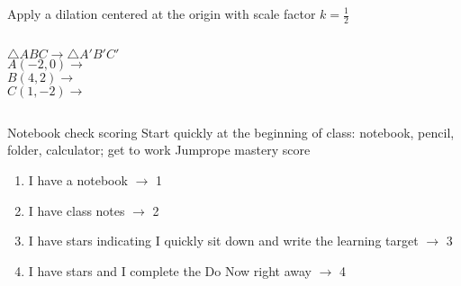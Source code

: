 \begin{frame}{Apply a dilation centered at the origin with scale factor $k=\frac{1}{2}$}
  \begin{columns}
    $\triangle ABC \rightarrow \triangle A'B'C'$\\[0.5cm]
    $A(-2,0) \rightarrow $\\[0.5cm]
    $B(4,2) \rightarrow$\\[0.5cm]
    $C(1,-2) \rightarrow$\\[0.5cm]
    \begin{flushright}
    \end{flushright}
  \end{columns}
\end{frame}

\begin{frame}{Notebook check scoring}
  {Start quickly at the beginning of class: notebook, pencil, folder, calculator; get to work}
    Jumprope mastery score
    \begin{enumerate}
      \item I have a notebook $\rightarrow$ 1
      \item I have class notes $\rightarrow$ 2
      \item I have stars indicating I quickly sit down and write the learning target $\rightarrow$ 3
      \item I have stars and I complete the Do Now right away $\rightarrow$ 4
    \end{enumerate} \bigskip
\end{frame}

